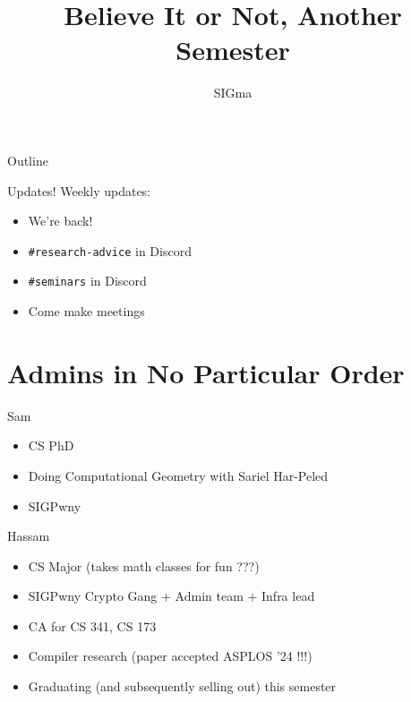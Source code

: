 \documentclass[aspectratio=169]{beamer}
\title{Believe It or Not, Another Semester}
\subtitle{}
\author{SIGma}
\date{}
\begin{document}

\begin{frame}
\titlepage
\end{frame}

\begin{frame}{Outline}
  \tableofcontents
\end{frame}

\begin{frame}{Updates!}
  Weekly updates:
  \begin{itemize}
    \item We're back!
    \item \texttt{\#research-advice} in Discord
    \item \texttt{\#seminars} in Discord
    \item Come make meetings 
  \end{itemize}
\end{frame}

\section{Admins in No Particular Order}
\frame{\sectionpage}

\begin{frame}{Sam}
    \begin{itemize}
    \item CS PhD
    \item Doing Computational Geometry with Sariel Har-Peled
    \item SIGPwny
    \end{itemize}
\end{frame}

\begin{frame}{Hassam}
    \begin{itemize}
        \item CS Major (takes math classes for fun ???)
        \item SIGPwny Crypto Gang + Admin team + Infra lead
        \item CA for CS 341, CS 173
        \item Compiler research (paper accepted ASPLOS '24 !!!)
        \item Graduating (and subsequently selling out) this semester
    \end{itemize}
\end{frame}
\end{document}

